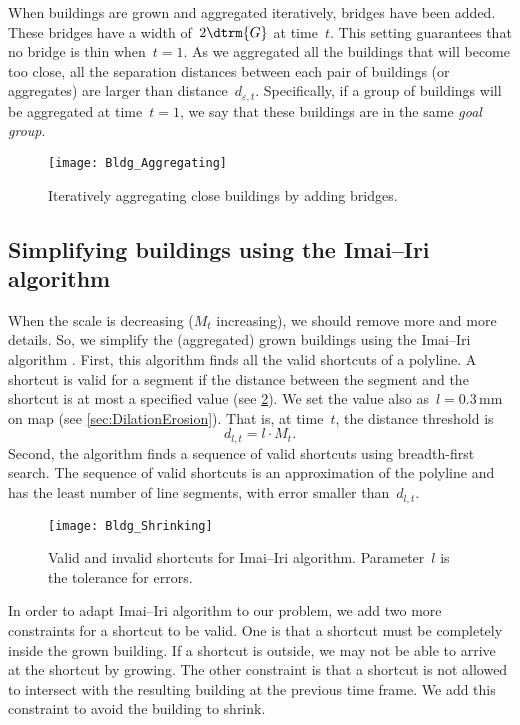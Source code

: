 When buildings are grown and aggregated iteratively, 
bridges have been added. 
These bridges have a width of~$2\dtrm{G}$ at time~$t$.
This setting guarantees that no bridge is thin when~$t=1$.
As we aggregated all the buildings that will become too close, 
all the separation distances between each pair of buildings (or aggregates) are larger than distance~$d_{\varepsilon, t}$.
Specifically, if a group of buildings 
will be aggregated at time~$t=1$, 
we say that these buildings are in the same \emph{goal group}. 

\begin{figure}[tb]
	\centering
	\texttt{[image: Bldg\_Aggregating]}
	\caption{Iteratively aggregating close buildings 
		by adding bridges.
	}
	\label{fig:BridgeMoreBuilding}
\end{figure}

\subsection{Simplifying buildings using the Imai--Iri algorithm}
\label{sec:ImaiIri}

When the scale is decreasing ($M_t$ increasing), 
we should remove more and more details. 
So, we simplify the (aggregated) grown buildings
using the Imai--Iri algorithm \citep{ImaiIri1988}.
First, this algorithm finds 
all the valid shortcuts of a polyline.
A shortcut is valid for a segment 
if the distance between the segment and the shortcut 
is at most a specified value
(see \fig\ref{fig:ImaiIri_Shortcut}).
We set the value also as~$l=0.3\,\mathrm{mm}$ on map
(see \sect\ref{sec:DilationErosion}). 
That is, at time~$t$, the distance threshold is
\begin{equation}
\label{eq:d_lt}
d_{l,t}= l \cdot M_t.
\end{equation}
Second, the algorithm finds a sequence of valid shortcuts
using breadth-first search.
The sequence of valid shortcuts 
is an approximation of the polyline 
and has the least number of line segments, 
with error smaller than~$d_{l,t}$.

\begin{figure}[tb]
	\centering
	\texttt{[image: Bldg\_Shrinking]}
	\caption{Valid and invalid shortcuts 
		for Imai--Iri algorithm.
		Parameter~$l$ is the tolerance for errors.}
	\label{fig:ImaiIri_Shortcut}
\end{figure}

In order to adapt Imai--Iri algorithm to our problem,
we add two more constraints for a shortcut to be valid. 
One is that a shortcut must be 
completely inside the grown building.
If a shortcut is outside,
we may not be able to arrive at the shortcut by growing.
The other constraint is that 
a shortcut is not allowed to intersect with
the resulting building at the previous time frame.
We add this constraint 
to avoid the building to shrink.

